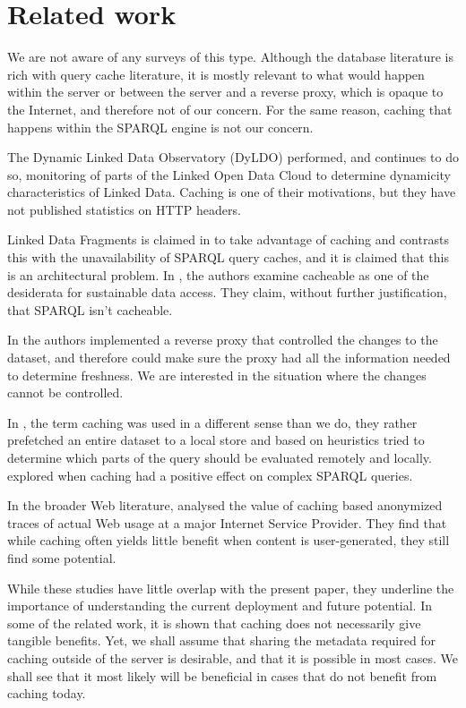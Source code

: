 \documentclass{llncs}
\begin{document}
\section{Related work}

We are not aware of any surveys of this type. Although the database
literature is rich with query cache literature, it is mostly relevant
to what would happen within the server or between the server and a
reverse proxy, which is opaque to the Internet, and therefore not of
our concern. For the same reason, caching that happens within the
SPARQL engine is not our concern.

The Dynamic Linked Data Observatory (DyLDO) \cite{dyldo2} performed,
and continues to do so, monitoring of parts of the Linked Open Data
Cloud to determine dynamicity characteristics of Linked Data. Caching
is one of their motivations, but they have not published statistics on
HTTP headers.

Linked Data Fragments is claimed in \cite{ldf1} to take advantage of
caching and contrasts this with the unavailability of SPARQL query
caches, and it is claimed that this is an architectural problem. In
\cite{hogan2014paths}, the authors examine cacheable as one of the
desiderata for sustainable data access. They claim, without further
justification, that SPARQL isn't cacheable. 

In \cite{sparqlproxy} the authors implemented a reverse proxy that
controlled the changes to the dataset, and therefore could make sure
the proxy had all the information needed to determine freshness. We
are interested in the situation where the changes cannot be
controlled.

In \cite{umbrich2012hybrid}, the term caching was used in a different
sense than we do, they rather prefetched an entire dataset to a local
store and based on heuristics tried to determine which parts of the
query should be evaluated remotely and locally. \cite{lampo2011cache}
explored when caching had a positive effect on complex SPARQL
queries.

In the broader Web literature, \cite{ager2010revisiting} analysed the
value of caching based anonymized traces of actual Web usage at a
major Internet Service Provider. They find that while caching often
yields little benefit when content is user-generated, they still find
some potential.

While these studies have little overlap with the present paper, they
underline the importance of understanding the current deployment and
future potential. In some of the related work, it is shown that
caching does not necessarily give tangible benefits. Yet, we shall
assume that sharing the metadata required for caching outside of the
server is desirable, and that it is possible in most cases. We shall
see that it most likely will be beneficial in cases that do not
benefit from caching today.
\end{document}
